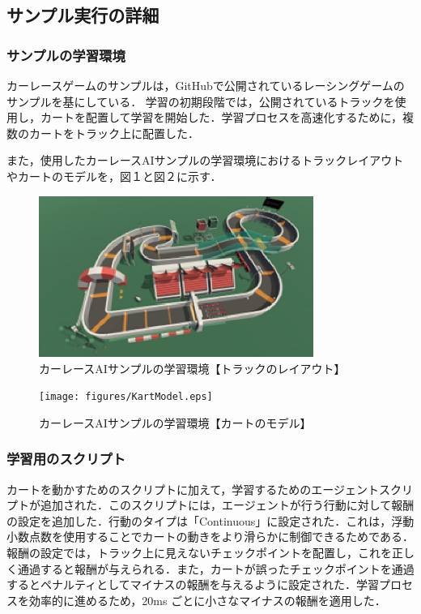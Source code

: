\subsection{サンプル実行の詳細}
\subsubsection{サンプルの学習環境}
カーレースゲームのサンプルは，GitHubで公開されているレーシングゲームのサンプル\cite{AI-Racing-Karts}を基にしている．
学習の初期段階では，公開されているトラックを使用し，カートを配置して学習を開始した．学習プロセスを高速化するために，複数のカートをトラック上に配置した．

また，使用したカーレースAIサンプルの学習環境におけるトラックレイアウトやカートのモデルを，図１と図２に示す．

\begin{figure}[H]
    \centering
    \includegraphics[width=0.8\textwidth]{figures/TrackLayout.eps}
    \caption{カーレースAIサンプルの学習環境【トラックのレイアウト】}
    \label{fig:sample-environment}
\end{figure}

\begin{figure}[H]
    \centering
    \texttt{[image: figures/KartModel.eps]}
    \caption{カーレースAIサンプルの学習環境【カートのモデル】}
    \label{fig:kart-model}
\end{figure}

\subsubsection{学習用のスクリプト}
カートを動かすためのスクリプトに加えて，学習するためのエージェントスクリプトが追加された．このスクリプトには，エージェントが行う行動に対して報酬の設定を追加した．行動のタイプは「Continuous」に設定された．これは，浮動小数点数を使用することでカートの動きをより滑らかに制御できるためである．報酬の設定では，トラック上に見えないチェックポイントを配置し，これを正しく通過すると報酬が与えられる．また，カートが誤ったチェックポイントを通過するとペナルティとしてマイナスの報酬を与えるように設定された．学習プロセスを効率的に進めるため，20ms ごとに小さなマイナスの報酬を適用した．

